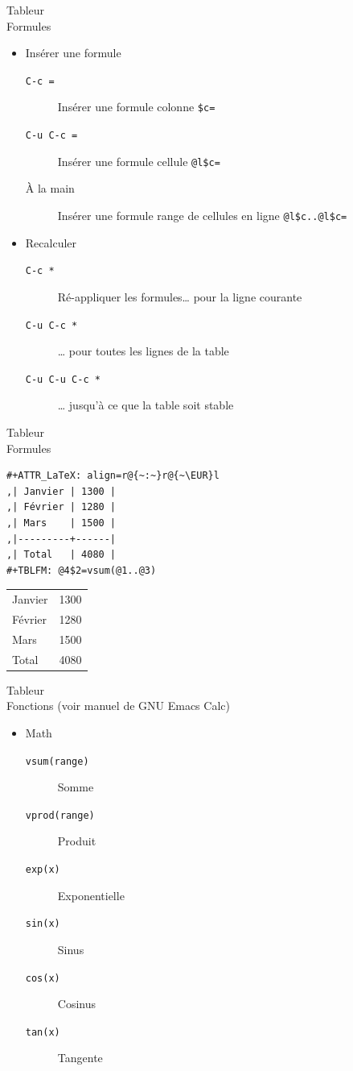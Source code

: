 \documentclass[presentation,t,hideothersubsections]{beamer}
\begin{document}
\begin{frame}[fragile,label=sec-3-3-7]{Tableur \\ Formules}
 \begin{itemize}
\item Insérer une formule
\begin{description}
\item[\texttt{C-c =}] Insérer une formule \alert{colonne} \texttt{\$c=}
\item[\texttt{C-u C-c =}] Insérer une formule \alert{cellule} \texttt{@l\$c=}
\item[À la main] Insérer une formule \alert{range de cellules en ligne} \texttt{@l\$c..@l\$c=}
\end{description}

\item Recalculer
\begin{description}
\item[\texttt{C-c *}] Ré-appliquer les formules\ldots{} pour la \alert{ligne courante}
\item[\texttt{C-u C-c *}] \ldots{} pour toutes les lignes de la table
\item[\texttt{C-u C-u C-c *}] \ldots{} jusqu'à ce que la \alert{table} soit \alert{stable}
\end{description}
\end{itemize}
\end{frame}
\begin{frame}[fragile,label=sec-3-3-8]{Tableur \\ Formules}
 \lstset{language=org,numbers=none}
\begin{lstlisting}
#+ATTR_LaTeX: align=r@{~:~}r@{~\EUR}l
,| Janvier | 1300 |
,| Février | 1280 |
,| Mars    | 1500 |
,|---------+------|
,| Total   | 4080 |
#+TBLFM: @4$2=vsum(@1..@3)
\end{lstlisting}

\begin{center}
\begin{tabular}{lr}
Janvier & 1300\\
Février & 1280\\
Mars & 1500\\
\hline
Total & 4080\\
\end{tabular}
\end{center}
\end{frame}
\begin{frame}[fragile,label=sec-3-3-9]{Tableur \\ Fonctions (voir manuel de GNU Emacs Calc)}
 \begin{itemize}
\item Math
\begin{description}
\item[\texttt{vsum(range)}] Somme
\item[\texttt{vprod(range)}] Produit
\item[\texttt{exp(x)}] Exponentielle
\item[\texttt{sin(x)}] Sinus
\item[\texttt{cos(x)}] Cosinus
\item[\texttt{tan(x)}] Tangente
\end{description}
\end{itemize}
\end{frame}
\end{document}
